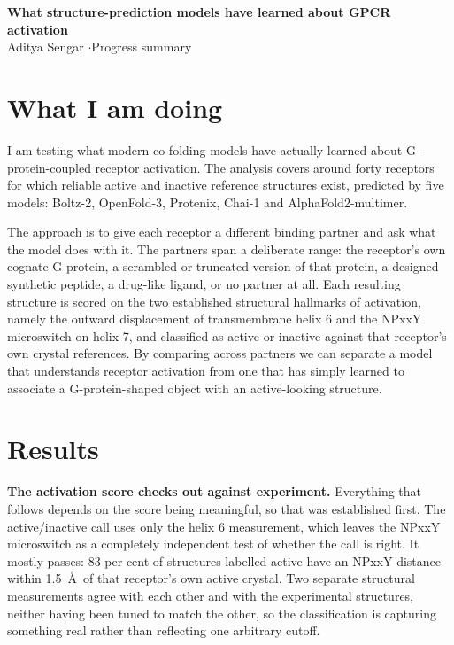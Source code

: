 \documentclass[11pt,a4paper]{article}
\begin{document}
\begin{center}
{\Large\bfseries What structure-prediction models have learned about GPCR activation}\\[3pt]
{\small Aditya Sengar \quad$\cdot$\quad Progress summary}
\end{center}

\section*{What I am doing}

I am testing what modern co-folding models have actually learned about G-protein-coupled receptor
activation. The analysis covers around forty receptors for which reliable active and inactive
reference structures exist, predicted by five models: Boltz-2, OpenFold-3, Protenix, Chai-1 and
AlphaFold2-multimer.

The approach is to give each receptor a different binding partner and ask what the model does with
it. The partners span a deliberate range: the receptor's own cognate G protein, a scrambled or
truncated version of that protein, a designed synthetic peptide, a drug-like ligand, or no partner
at all. Each resulting structure is scored on the two established structural hallmarks of
activation, namely the outward displacement of transmembrane
helix 6 and the NPxxY microswitch on helix 7, and classified as active or inactive against that receptor's own crystal references.
By comparing across partners we can separate a model that understands receptor activation from one
that has simply learned to associate a G-protein-shaped object with an active-looking structure.

\section*{Results}

\textbf{The activation score checks out against experiment.} Everything that follows depends on the
score being meaningful, so that was established first. The active/inactive call uses only the helix 6
measurement, which leaves the NPxxY microswitch as a completely independent test of whether the call
is right. It mostly passes: 83 per cent of structures labelled active have an NPxxY distance within
1.5~\AA\ of that receptor's own active crystal. Two separate structural measurements agree with each
other and with the experimental structures, neither having been tuned to match the other, so the
classification is capturing something real rather than reflecting one arbitrary cutoff.
\end{document}
